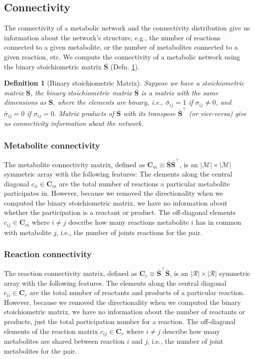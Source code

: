 \documentclass{article}[11pt]
\newtheorem{defn}{Definition}
\begin{document}
\subsection{Connectivity}
The connectivity of a metabolic network and the connectivity distribution give us information about the network's structure, e.g., 
the number of reactions connected to a given metabolite, or the number of metabolites connected to a given reaction, etc. We compute the connectivity of a metabolic network using the binary stoichiometric matrix $\bar{\mathbf{S}}$ (Defn. \ref{defn-binary-stoichiometric-matrix}).

\begin{defn}[Binary stoichiometric Matrix]\label{defn-binary-stoichiometric-matrix}
Suppose we have a stoichiometric matrix $\mathbf{S}$, the binary stoichiometric matrix $\bar{\mathbf{S}}$ is a matrix with the same dimensions as $\mathbf{S}$, where the elements are binary, i.e., $\bar{\sigma}_{ij} = 1$ if $\sigma_{ij}\neq 0$, and $\bar{\sigma}_{ij} = 0$ if $\sigma_{ij} = 0$. Matrix products of $\bar{\mathbf{S}}$ with its transpose $\bar{\mathbf{S}}^{\top}$ (or vice-versa) give us connectivity information about the network.
\end{defn}

\subsubsection*{Metabolite connectivity} The metabolite connectivity matrix, defined as $\mathbf{C}_{m} \equiv \bar{\mathbf{S}}\bar{\mathbf{S}}^{\top}$, is an $|\mathcal{M}|\times|\mathcal{M}|$ symmetric array with the following features:
The elements along the central diagonal $c_{ii}\in\mathbf{C}_{m}$ are the total number of reactions a particular metabolite participates in. However, because we removed the directionality when we computed the binary stoichiometric matrix, we have no information about whether the participation is a reactant or product. The off-diagonal elements $c_{ij}\in\mathbf{C}_{m}$ where $i\neq{j}$ describe how many reactions metabolite $i$ has in common with metabolite $j$, i.e., the number of joints reactions for the pair.

\subsubsection*{Reaction connectivity} The reaction connectivity matrix, defined as $\mathbf{C}_{r} \equiv \bar{\mathbf{S}}^{\top}\bar{\mathbf{S}}$, is an $|\mathcal{R}|\times|\mathcal{R}|$ symmetric array with the following features.
The elements along the central diagonal $c_{ii}\in\mathbf{C}_{r}$ are the total number of reactants and products of a particular reaction. 
However, because we removed the directionality when we computed the binary stoichiometric matrix, we have no information about the number of reactants or products, just the total participation number for a reaction.
The off-diagonal elements of the reaction matrix $c_{ij}\in\mathbf{C}_{r}$ where $i\neq{j}$ describe how many metabolites are shared between reaction $i$ and $j$, i.e., the number of joint metabolites for the pair.
\end{document}
